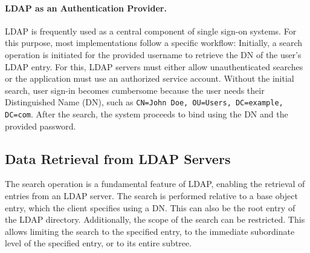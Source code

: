 \paragraph{LDAP as an Authentication Provider.}
LDAP is frequently used as a central component of single sign-on systems. For this purpose, most implementations follow a specific workflow: Initially, a search operation is initiated for the provided username to retrieve the \gls{DN} of the user's \gls{LDAP} entry. For this, LDAP servers must either allow unauthenticated searches or the application must use an authorized service account. Without the initial search, user sign-in becomes cumbersome because the user needs their Distinguished Name (DN), such as \texttt{CN=John Doe, OU=Users, DC=example, DC=com}.  After the search, the system proceeds to bind using the DN and the provided password. 

\subsection{Data Retrieval from LDAP Servers}



The search operation is a fundamental feature of LDAP, enabling the retrieval of entries from an LDAP server. The search is performed relative to a base object entry, which the client specifies using a DN. This can also be the root entry of the LDAP directory. Additionally, the scope of the search can be restricted. This allows limiting the search to the specified entry, to the immediate subordinate level of the specified entry, or to its entire subtree.

